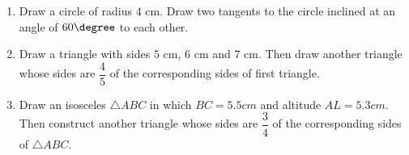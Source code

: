 \begin{enumerate}
\item Draw a circle of radius $4$ cm. Draw two tangents to the circle inclined at an angle of $ 60 \degree $ to each other.\\
\item Draw a triangle with sides $5$ cm, $6$ cm and $7$ cm. Then draw another triangle whose sides are $\dfrac{4}{5}$ of the corresponding sides of first triangle.\\
\item Draw an isosceles $\triangle ABC$ in which $BC=5.5 cm$ and altitude $AL=5.3 cm$. Then construct another triangle whose sides are $\dfrac{3}{4}$ of the corresponding sides of $\triangle ABC$.
\end{enumerate}
